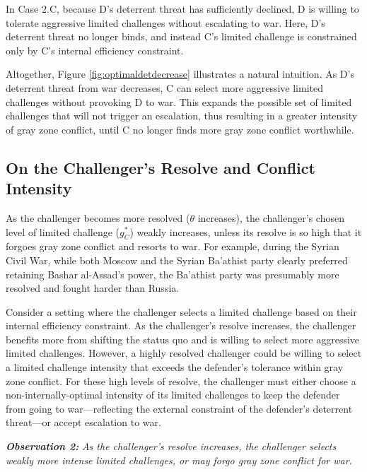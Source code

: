 \documentclass[
]{article}
\begin{document}
In Case 2.C, because D's deterrent threat has sufficiently declined, D is willing to tolerate aggressive limited challenges without escalating to war. Here, D's deterrent threat no longer binds, and instead C's limited challenge is constrained only by C's internal efficiency constraint.

Altogether, Figure \ref{fig:optimaldetdecrease} illustrates a natural intuition. As D's deterrent threat from war decreases, C can select more aggressive limited challenges without provoking D to war. This expands the possible set of limited challenges that will not trigger an escalation, thus resulting in a greater intensity of gray zone conflict, until C no longer finds more gray zone conflict worthwhile.

\hypertarget{on-the-challengers-resolve-and-conflict-intensity}{%
\subsection{On the Challenger's Resolve and Conflict Intensity}\label{on-the-challengers-resolve-and-conflict-intensity}}

As the challenger becomes more resolved (\(\theta\) increases), the challenger's chosen level of limited challenge (\(g_{C}^{*}\)) weakly increases, unless its resolve is so high that it forgoes gray zone conflict and resorts to war. For example, during the Syrian Civil War, while both Moscow and the Syrian Ba'athist party clearly preferred retaining Bashar al-Assad's power, the Ba'athist party was presumably more resolved and fought harder than Russia.

Consider a setting where the challenger selects a limited challenge based on their internal efficiency constraint. As the challenger's resolve increases, the challenger benefits more from shifting the status quo and is willing to select more aggressive limited challenges. However, a highly resolved challenger could be willing to select a limited challenge intensity that exceeds the defender's tolerance within gray zone conflict. For these high levels of resolve, the challenger must either choose a non-internally-optimal intensity of its limited challenges to keep the defender from going to war---reflecting the external constraint of the defender's deterrent threat---or accept escalation to war.

\textbf{\textit{Observation 2:}}\textit{ As the challenger's resolve increases, the challenger selects weakly more intense limited challenges, or may forgo gray zone conflict for war.}
\end{document}
